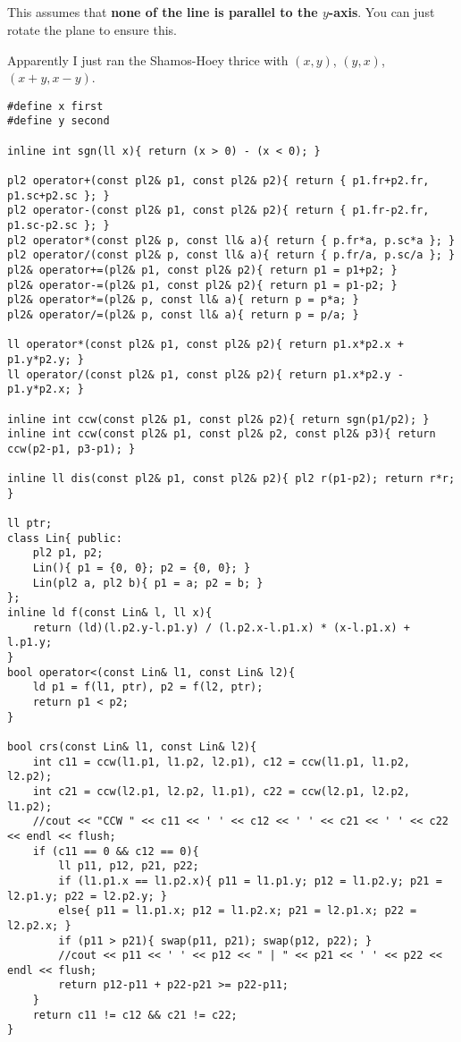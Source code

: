 \documentclass[landscape, 8pt, a4paper, oneside, twocolumn]{extarticle}
\begin{document}
\subsection{}
This assumes that \textbf{none of the line is parallel to the $y$-axis}. You can just rotate the plane to ensure this.

Apparently I just ran the Shamos-Hoey thrice with $(x,y)$, $(y,x)$, $(x+y,x-y)$.
\begin{verbatim}
#define x first
#define y second

inline int sgn(ll x){ return (x > 0) - (x < 0); }

pl2 operator+(const pl2& p1, const pl2& p2){ return { p1.fr+p2.fr, p1.sc+p2.sc }; }
pl2 operator-(const pl2& p1, const pl2& p2){ return { p1.fr-p2.fr, p1.sc-p2.sc }; }
pl2 operator*(const pl2& p, const ll& a){ return { p.fr*a, p.sc*a }; }
pl2 operator/(const pl2& p, const ll& a){ return { p.fr/a, p.sc/a }; }
pl2& operator+=(pl2& p1, const pl2& p2){ return p1 = p1+p2; }
pl2& operator-=(pl2& p1, const pl2& p2){ return p1 = p1-p2; }
pl2& operator*=(pl2& p, const ll& a){ return p = p*a; }
pl2& operator/=(pl2& p, const ll& a){ return p = p/a; }

ll operator*(const pl2& p1, const pl2& p2){ return p1.x*p2.x + p1.y*p2.y; }
ll operator/(const pl2& p1, const pl2& p2){ return p1.x*p2.y - p1.y*p2.x; }

inline int ccw(const pl2& p1, const pl2& p2){ return sgn(p1/p2); }
inline int ccw(const pl2& p1, const pl2& p2, const pl2& p3){ return ccw(p2-p1, p3-p1); }

inline ll dis(const pl2& p1, const pl2& p2){ pl2 r(p1-p2); return r*r; }

ll ptr;
class Lin{ public:
	pl2 p1, p2;
	Lin(){ p1 = {0, 0}; p2 = {0, 0}; }
	Lin(pl2 a, pl2 b){ p1 = a; p2 = b; }
};
inline ld f(const Lin& l, ll x){
	return (ld)(l.p2.y-l.p1.y) / (l.p2.x-l.p1.x) * (x-l.p1.x) + l.p1.y;
}
bool operator<(const Lin& l1, const Lin& l2){
	ld p1 = f(l1, ptr), p2 = f(l2, ptr);
	return p1 < p2;
}

bool crs(const Lin& l1, const Lin& l2){
	int c11 = ccw(l1.p1, l1.p2, l2.p1), c12 = ccw(l1.p1, l1.p2, l2.p2);
	int c21 = ccw(l2.p1, l2.p2, l1.p1), c22 = ccw(l2.p1, l2.p2, l1.p2);
	//cout << "CCW " << c11 << ' ' << c12 << ' ' << c21 << ' ' << c22 << endl << flush;
	if (c11 == 0 && c12 == 0){
		ll p11, p12, p21, p22;
		if (l1.p1.x == l1.p2.x){ p11 = l1.p1.y; p12 = l1.p2.y; p21 = l2.p1.y; p22 = l2.p2.y; }
		else{ p11 = l1.p1.x; p12 = l1.p2.x; p21 = l2.p1.x; p22 = l2.p2.x; }
		if (p11 > p21){ swap(p11, p21); swap(p12, p22); }
		//cout << p11 << ' ' << p12 << " | " << p21 << ' ' << p22 << endl << flush;
		return p12-p11 + p22-p21 >= p22-p11;
	}
	return c11 != c12 && c21 != c22;
}


\end{verbatim}
\end{document}
